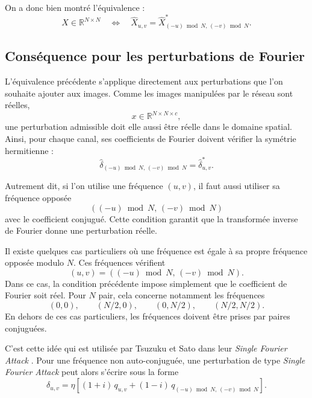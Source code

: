 On a donc bien montré l'équivalence :
\[
    X\in\mathbb{R}^{N\times N}
    \quad\Longleftrightarrow\quad
    \widehat{X}_{u,v}
    =
    \widehat{X}^{*}_{(-u)\bmod N,\,(-v)\bmod N}.
\]

\subsection{Conséquence pour les perturbations de Fourier}

L'équivalence précédente s'applique directement aux perturbations que l'on souhaite ajouter aux images.
Comme les images manipulées par le réseau sont réelles,
\[
    x \in \mathbb{R}^{N\times N\times c},
\]
une perturbation admissible doit elle aussi être réelle dans le domaine spatial. Ainsi, pour chaque canal,
ses coefficients de Fourier doivent vérifier la symétrie hermitienne :
\begin{equation}
    \widehat{\delta}_{(-u)\bmod N,\,(-v)\bmod N}
    =
    \widehat{\delta}_{u,v}^{*}.
    \label{eq:contrainte_reelle_perturbation_fourier}
\end{equation}

Autrement dit, si l'on utilise une fréquence \((u,v)\), il faut aussi utiliser sa fréquence opposée
\[
    ((-u)\bmod N,\,(-v)\bmod N)
\]
avec le coefficient conjugué. Cette condition garantit que la transformée inverse de Fourier donne une perturbation réelle.

Il existe quelques cas particuliers où une fréquence est égale à sa propre fréquence opposée modulo $N$.
Ces fréquences vérifient
\[
    (u,v)
    =
    ((-u)\bmod N,\,(-v)\bmod N).
\]
Dans ce cas, la condition précédente impose simplement que le coefficient de Fourier soit réel. Pour
$N$ pair, cela concerne notamment les fréquences
\[
    (0,0),
    \qquad
    (N/2,0),
    \qquad
    (0,N/2),
    \qquad
    (N/2,N/2).
\]
En dehors de ces cas particuliers, les fréquences doivent être prises par paires conjuguées.

C'est cette idée qui est utilisée par Tsuzuku et Sato dans leur \textit{Single Fourier Attack}
\cite{tsuzuku2019structural}. 
Pour une fréquence non auto-conjuguée, une perturbation de type \textit{Single Fourier Attack}
peut alors s'écrire sous la forme
\begin{equation}
    \delta_{u,v}
    =
    \eta
    \left[
        (1+i)\,q_{u,v}
        +
        (1-i)\,q_{(-u)\bmod N,\,(-v)\bmod N}
    \right].
    \label{eq:sfa_perturbation_fourier}
\end{equation}

